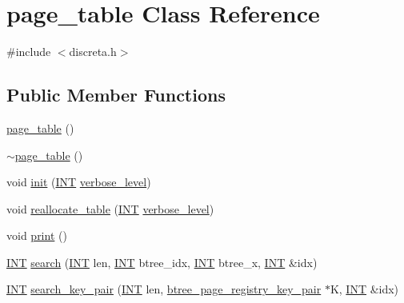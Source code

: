 \hypertarget{classpage__table}{}\section{page\+\_\+table Class Reference}
\label{classpage__table}


{\ttfamily \#include $<$discreta.\+h$>$}

\subsection*{Public Member Functions}
\begin{DoxyCompactItemize}
\item 
\mbox{\hyperlink{classpage__table_ab2abc07d84f8c5049365e613b5ecbd6f}{page\+\_\+table}} ()
\item 
\mbox{\hyperlink{classpage__table_a0ebbe83b48bf125b309e41c92cb09850}{$\sim$page\+\_\+table}} ()
\item 
void \mbox{\hyperlink{classpage__table_a046f41976c1bb69534449e719ef7168a}{init}} (\mbox{\hyperlink{galois_8h_a09fddde158a3a20bd2dcadb609de11dc}{I\+NT}} \mbox{\hyperlink{simeon_8_c_a818073fbcc2f439e7c56952f67386122}{verbose\+\_\+level}})
\item 
void \mbox{\hyperlink{classpage__table_ae38b42623cb168c948dad1e3765714f1}{reallocate\+\_\+table}} (\mbox{\hyperlink{galois_8h_a09fddde158a3a20bd2dcadb609de11dc}{I\+NT}} \mbox{\hyperlink{simeon_8_c_a818073fbcc2f439e7c56952f67386122}{verbose\+\_\+level}})
\item 
void \mbox{\hyperlink{classpage__table_a8cc167e59ef8166bfe511c5a950b8fc0}{print}} ()
\item 
\mbox{\hyperlink{galois_8h_a09fddde158a3a20bd2dcadb609de11dc}{I\+NT}} \mbox{\hyperlink{classpage__table_a6a785ea8bdc6d346f1fce0181f76969c}{search}} (\mbox{\hyperlink{galois_8h_a09fddde158a3a20bd2dcadb609de11dc}{I\+NT}} len, \mbox{\hyperlink{galois_8h_a09fddde158a3a20bd2dcadb609de11dc}{I\+NT}} btree\+\_\+idx, \mbox{\hyperlink{galois_8h_a09fddde158a3a20bd2dcadb609de11dc}{I\+NT}} btree\+\_\+x, \mbox{\hyperlink{galois_8h_a09fddde158a3a20bd2dcadb609de11dc}{I\+NT}} \&idx)
\item 
\mbox{\hyperlink{galois_8h_a09fddde158a3a20bd2dcadb609de11dc}{I\+NT}} \mbox{\hyperlink{classpage__table_ad382cc58d94dfe8edb98d11748c800b8}{search\+\_\+key\+\_\+pair}} (\mbox{\hyperlink{galois_8h_a09fddde158a3a20bd2dcadb609de11dc}{I\+NT}} len, \mbox{\hyperlink{structbtree__page__registry__key__pair}{btree\+\_\+page\+\_\+registry\+\_\+key\+\_\+pair}} $\ast$K, \mbox{\hyperlink{galois_8h_a09fddde158a3a20bd2dcadb609de11dc}{I\+NT}} \&idx)

\end{DoxyCompactItemize}
